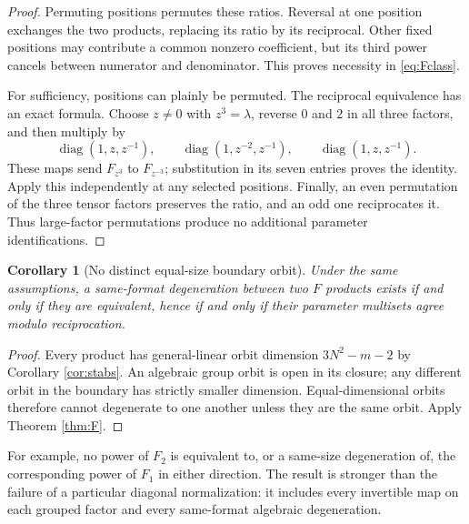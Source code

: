 \documentclass[11pt]{article}
\newtheorem{corollary}[theorem]{Corollary}
\theoremstyle{remark}\newtheorem{remark}[theorem]{Remark}
\newcommand{\diag}{\operatorname{diag}}
\begin{document}
\begin{proof}
Permuting positions permutes these ratios. Reversal at one position exchanges the two products, replacing its ratio by its reciprocal. Other fixed positions may contribute a common nonzero coefficient, but its third power cancels between numerator and denominator. This proves necessity in \eqref{eq:Fclass}.

For sufficiency, positions can plainly be permuted. The reciprocal equivalence has an exact formula. Choose $z\ne0$ with $z^3=\lambda$, reverse $0$ and $2$ in all three factors, and then multiply by
\begin{equation}\label{eq:inverse}
 \diag(1,z,z^{-1}),\qquad
 \diag(1,z^{-2},z^{-1}),\qquad
 \diag(1,z,z^{-1}).
\end{equation}
These maps send $F_{z^3}$ to $F_{z^{-3}}$; substitution in its seven entries proves the identity. Apply this independently at any selected positions. Finally, an even permutation of the three tensor factors preserves the ratio, and an odd one reciprocates it. Thus large-factor permutations produce no additional parameter identifications.
\end{proof}

\begin{corollary}[No distinct equal-size boundary orbit]\label{cor:Fboundary}
Under the same assumptions, a same-format degeneration between two $F$ products exists if and only if they are equivalent, hence if and only if their parameter multisets agree modulo reciprocation.
\end{corollary}
\begin{proof}
Every product has general-linear orbit dimension $3N^2-m-2$ by Corollary \ref{cor:stabs}. An algebraic group orbit is open in its closure; any different orbit in the boundary has strictly smaller dimension. Equal-dimensional orbits therefore cannot degenerate to one another unless they are the same orbit. Apply Theorem \ref{thm:F}.
\end{proof}

For example, no power of $F_2$ is equivalent to, or a same-size degeneration of, the corresponding power of $F_1$ in either direction. The result is stronger than the failure of a particular diagonal normalization: it includes every invertible map on each grouped factor and every same-format algebraic degeneration.
\end{document}
